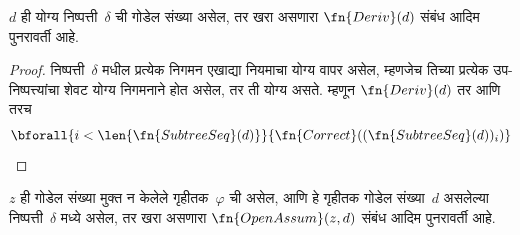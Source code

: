 \begin{prop}
  \label{inc:art:pnd:prop:deriv}
  $d$ ही योग्य निष्पत्ती~$\delta$ ची गोडेल संख्या असेल,
  तर खरा असणारा $\fn{Deriv}(d)$ संबंध आदिम पुनरावर्ती आहे.
\end{prop}

\begin{proof}
  निष्पत्ती~$\delta$ मधील प्रत्येक निगमन एखाद्या नियमाचा
  योग्य वापर असेल, म्हणजेच तिच्या प्रत्येक उप-निष्पत्त्यांचा
  शेवट योग्य निगमनाने होत असेल, तर ती योग्य असते. म्हणून
  $\fn{Deriv}(d)$ तर आणि तरच
  \[  \bforall{i<\len{\fn{SubtreeSeq}(d)}}{\fn{Correct}((\fn{SubtreeSeq}(d))_i)}
  \]
\end{proof}

\begin{prop}
  \label{inc:art:pnd:prop:openassum} $z$ ही गोडेल संख्या
  मुक्त न केलेले गृहीतक~$\varphi$ ची असेल, आणि हे गृहीतक
  गोडेल संख्या~$d$ असलेल्या निष्पत्ती~$\delta$ मध्ये असेल,
  तर खरा असणारा $\fn{OpenAssum}(z, d)$ संबंध आदिम पुनरावर्ती आहे.
\end{prop}

